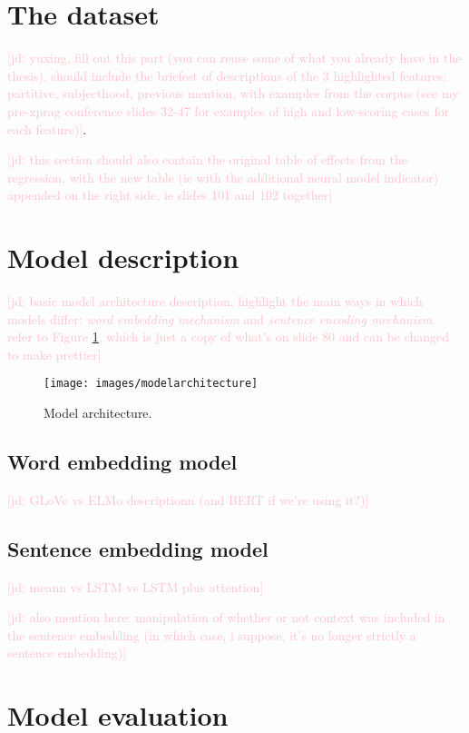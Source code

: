 \documentclass[11pt,a4paper]{article}
\newcommand{\figref}[1]{Figure \ref{#1}}
\newcommand{\jd}[1]{\textcolor{Pink}{[jd: #1]}}
\begin{document}
\section{The dataset}

\jd{yuxing, fill out this part (you can reuse some of what you already have in the thesis). should include the briefest of descriptions of the 3 highlighted features: partitive, subjecthood, previous mention, with examples from the corpus (see my pre-xprag conference slides 32-47 for examples of high and low-scoring cases for each feature)}.

\jd{this section should also contain the original table of effects from the regression, with the new table (ie with the additional neural model indicator) appended on the right side, ie slides 101 and 102 together}

\section{Model description}

\jd{basic model architecture description. highlight the main ways in which models differ: \emph{word embedding mechanism} and \emph{sentence encoding mechanism}. refer to \figref{fig:modelarchitecture}, which is just a copy of what's on slide 80 and can be changed to make prettier}

\begin{figure}
	\texttt{[image: images/modelarchitecture]}
	\caption{Model architecture.}
	\label{fig:modelarchitecture}
\end{figure}

\subsection{Word embedding model}

\jd{GLoVe vs ELMo descriptionn (and BERT if we're using it?)}

\subsection{Sentence embedding model}

\jd{meann vs LSTM vs LSTM plus attention}

\jd{also mention here: manipulation of whether or not context was included in the sentence embedding (in which case, i suppose, it's no longer strictly a sentence embedding)}

\section{Model evaluation}
\end{document}
